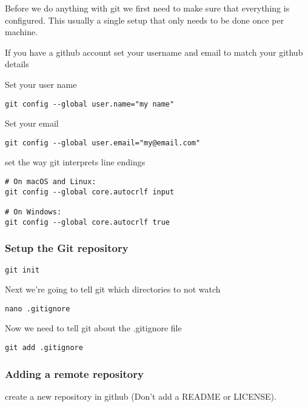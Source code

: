 \documentclass[]{book}
\begin{document}
Before we do anything with git we first need to make sure that
everything is configured. This usually a single setup that only needs to
be done once per machine.

If you have a github account set your username and email to match your
github details

Set your user name

\begin{verbatim}
git config --global user.name="my name"
\end{verbatim}

Set your email

\begin{verbatim}
git config --global user.email="my@email.com"
\end{verbatim}

set the way git interprets line endings

\begin{verbatim}
# On macOS and Linux:
git config --global core.autocrlf input

# On Windows:
git config --global core.autocrlf true
\end{verbatim}

\hypertarget{setup-the-git-repository}{%
\subsubsection{Setup the Git
repository}\label{setup-the-git-repository}}

\begin{verbatim}
git init
\end{verbatim}

Next we're going to tell git which directories to not watch

\begin{verbatim}
nano .gitignore
\end{verbatim}

Now we need to tell git about the .gitignore file

\begin{verbatim}
git add .gitignore
\end{verbatim}

\hypertarget{adding-a-remote-repository}{%
\subsubsection{Adding a remote
repository}\label{adding-a-remote-repository}}

create a new repository in github (Don't add a README or LICENSE).
\end{document}
